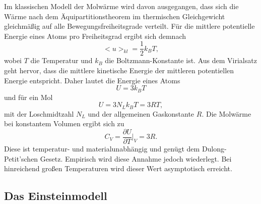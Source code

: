 Im klassischen Modell der Molwärme wird davon ausgegangen, dass sich die Wärme nach dem Äquipartitionstheorem im thermischen Gleichgewicht gleichmäßig auf alle Bewegungsfreiheitsgrade verteilt.
Für die mittlere potentielle Energie eines Atoms pro Freiheitsgrad ergibt sich demnach
\begin{equation}
  <u>_{kl} = \frac{1}{2}k_BT,
\end{equation}
wobei $T$ die Temperatur und $k_B$ die Boltzmann-Konstante \cite{scipy} ist.
Aus dem Virialsatz geht hervor, dass die mittlere kinetische Energie der mittleren potentiellen Energie entspricht.
Daher lautet die Energie eines Atoms
\begin{equation}
  U = 3k_BT
\end{equation}
und für ein Mol
\begin{equation}
  U = 3N_Lk_BT = 3RT,
\end{equation}
mit der Loschmidtzahl $N_L$ und der allgemeinen Gaskonstante $R$. \cite{scipy}
Die Molwärme bei konstantem Volumen ergibt sich zu
\begin{equation}
  C_V = \frac{\partial U}{\partial T}\bigr|_V = 3R.
\end{equation}
Diese ist temperatur- und materialunabhängig und genügt dem Dulong-Petit'schen Gesetz.
Empirisch wird diese Annahme jedoch wiederlegt.
Bei hinreichend großen Temperaturen wird dieser Wert asymptotisch erreicht.

\subsection{Das Einsteinmodell}

